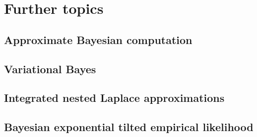 \chapter{Further topics}\label{chap15}

\section{Approximate Bayesian computation}\label{sec15_1}

\section{Variational Bayes}\label{sec15_2}

\section{Integrated nested Laplace approximations}\label{sec15_3}

\section{Bayesian exponential tilted empirical likelihood}\label{sec15_4}


